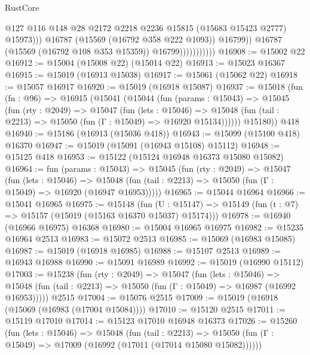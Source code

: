 \begin{lexlean}{RustCore}
\begin{coremodule}
                                    @127
                                    @116
                                    @148
                                    @28
                                    @2172
                                    @2218
                                    @2236
                                    @15815
                                    (@15683 @15423 @2777)
                                    @15973)))
                              @16787
                              (@15569 (@16792 @358 @222 @1093))
                              @16799))
                          @16787
                          (@15569 (@16792 @108 @353 @15359))
                          @16799)))))))))))
@16908 := @15002 @22
@16912 := @15004 (@15008 @22) (@15014 @22)
@16913 := @15023 @16367
@16915 := @15019 (@16913 @15038)
@16917 := @15061 (@15062 @22)
@16918 := @15057 @16917
@16920 := @15019 (@16918 @15087)
@16937 := @15018
    (fun (fn : @96) =>
    @16915
      (@15041
        (@15044
          (fun (params : @15043) =>
          @15045
            (fun (rty : @2049) =>
            @15047
              (fun (lets : @15046) =>
              @15048 (fun (tail : @2213) => @15050 (fun (Γ : @15049) => @16920 @15134))))))
        @15180))
    @418
@16940 := @15186 (@16913 (@15036 @418))
@16943 := @15099 (@15100 @418) @16370
@16947 := @15019 (@15091 (@16943 @15108) @15112)
@16948 := @15125 @418
@16953 := @15122 (@15124 @16948 @16373 @15080 @15082)
@16964 := fun (params : @15043) =>
  @15045
    (fun (rty : @2049) =>
    @15047
      (fun (lets : @15046) =>
      @15048 (fun (tail : @2213) => @15050 (fun (Γ : @15049) => @16920 (@16947 @16953)))))
@16965 := @15044 @16964
@16966 := @15041 @16965
@16975 := @15148
    (fun (U : @15147) => @15149 (fun (t : @7) => @15157 (@15019 (@15163 @16370 @15037) @15174)))
@16978 := @16940 (@16966 @16975) @16368
@16980 := @15004 @16965 @16975
@16982 := @15235 @16964 @2513
@16983 := @15072 @2513
@16985 := @15069 (@16983 @15085)
@16987 := @15019 (@16918 @16985)
@16988 := @15107 @2513
@16989 := @16943 @16988
@16990 := @15091 @16989
@16992 := @15019 (@16990 @15112)
@17003 := @15238
    (fun (rty : @2049) =>
    @15047
      (fun (lets : @15046) =>
      @15048 (fun (tail : @2213) => @15050 (fun (Γ : @15049) => @16987 (@16992 @16953)))))
    @2515
@17004 := @15076 @2515
@17009 := @15019 (@16918 (@15069 (@16983 (@17004 @15084))))
@17010 := @15120 @2515
@17011 := @15119 @17010
@17014 := @15123 @17010 @16948 @16373
@17026 := @15260
    (fun (lets : @15046) =>
    @15048
      (fun (tail : @2213) =>
      @15050 (fun (Γ : @15049) => @17009 (@16992 (@17011 (@17014 @15080 @15082))))))

\end{coremodule}
\end{lexlean}
